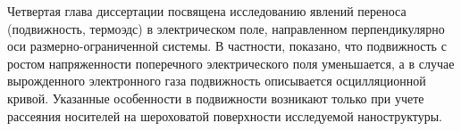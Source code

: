 Четвертая глава диссертации посвящена исследованию явлений переноса (подвижность, термоэдс) в электрическом поле, направленном перпендикулярно оси размерно-ограниченной системы. В частности, показано, что подвижность с ростом напряженности поперечного электрического поля уменьшается, а в случае вырожденного электронного газа подвижность описывается осцилляционной кривой. Указанные особенности в подвижности возникают только при учете рассеяния носителей на шероховатой поверхности исследуемой наноструктуры.

%
%
%
%
%
%
%
%


